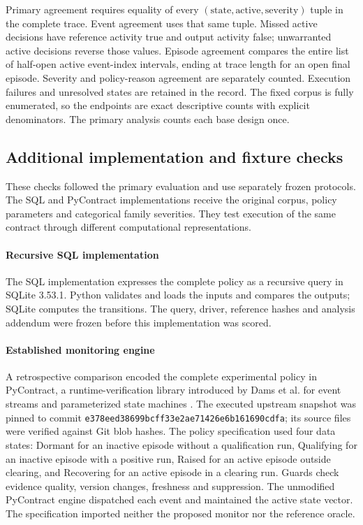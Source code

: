 \documentclass[preprint,11pt]{elsarticle}
\begin{document}
Primary agreement requires equality of every $(\text{state},\text{active},\text{severity})$ tuple in the complete trace. Event agreement uses that same tuple. Missed active decisions have reference activity true and output activity false; unwarranted active decisions reverse those values. Episode agreement compares the entire list of half-open active event-index intervals, ending at trace length for an open final episode. Severity and policy-reason agreement are separately counted. Execution failures and unresolved states are retained in the record. The fixed corpus is fully enumerated, so the endpoints are exact descriptive counts with explicit denominators. The primary analysis counts each base design once.

\subsection{Additional implementation and fixture checks}
These checks followed the primary evaluation and use separately frozen protocols. The SQL and PyContract implementations receive the original corpus, policy parameters and categorical family severities. They test execution of the same contract through different computational representations.

\paragraph{Recursive SQL implementation}
The SQL implementation expresses the complete policy as a recursive query in SQLite 3.53.1. Python validates and loads the inputs and compares the outputs; SQLite computes the transitions. The query, driver, reference hashes and analysis addendum were frozen before this implementation was scored.

\paragraph{Established monitoring engine}
A retrospective comparison encoded the complete experimental policy in PyContract, a runtime-verification library introduced by Dams et al. for event streams and parameterized state machines \cite{dams2022pycontract,pyrv2025pycontract}. The executed upstream snapshot was pinned to commit \texttt{e378eed38699bcff33e2ae71426e6b161690cdfa}; its source files were verified against Git blob hashes. The policy specification used four data states: Dormant for an inactive episode without a qualification run, Qualifying for an inactive episode with a positive run, Raised for an active episode outside clearing, and Recovering for an active episode in a clearing run. Guards check evidence quality, version changes, freshness and suppression. The unmodified PyContract engine dispatched each event and maintained the active state vector. The specification imported neither the proposed monitor nor the reference oracle.
\end{document}
